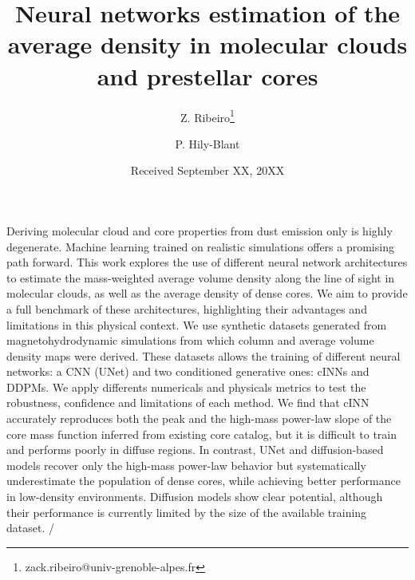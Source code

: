 \documentclass{aa}
\begin{document}
   \title{Neural networks estimation of the average density in molecular clouds and prestellar cores}


%

   \author{Z. Ribeiro\thanks{zack.ribeiro@univ-grenoble-alpes.fr}
        \and P. Hily-Blant
        }


   \date{Received September XX, 20XX}

 
  \abstract
   {Deriving molecular cloud and core properties from dust emission only is highly degenerate. Machine learning trained on realistic simulations offers a promising path forward.}
   {This work explores the use of different neural network architectures to estimate the mass-weighted average volume density along the line of sight in molecular clouds, as well as the average density of dense cores.
    We aim to provide a full benchmark of these architectures, highlighting their advantages and limitations in this physical context.} 
   {We use synthetic datasets generated from magnetohydrodynamic simulations from which column and average volume density maps were derived.
   These datasets allows the training of different neural networks: a CNN (UNet) and two conditioned generative ones: cINNs and DDPMs.
   We apply differents numericals and physicals metrics to test the robustness, confidence and limitations of each method.
   }
   {
   We find that cINN accurately reproduces both the peak and the high-mass power-law slope of the core mass function inferred from existing core catalog, but it is difficult to train and performs poorly in diffuse regions.
   In contrast, UNet and diffusion-based models recover only the high-mass power-law behavior but systematically underestimate the population of dense cores, while achieving better performance in low-density environments.
   Diffusion models show clear potential, although their performance is currently limited by the size of the available training dataset.
   }
   {/}
\end{document}

